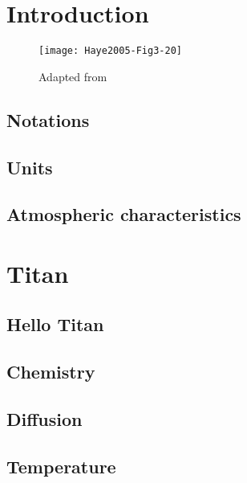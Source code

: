\documentclass{report}
\begin{document}
\title{\PINC}
\author{S.~Plessis \and K.~Mandt}
\date{\theversion}
\maketitle

\tableofcontents

\part{Introduction}
\begin{figure}
\centering
\texttt{[image: Haye2005-Fig3-20]}
\caption{Adapted from \cite{Haye2005}}
\end{figure}
\chapter{Notations}


\chapter{Units}


\chapter{Atmospheric characteristics}


\part{Titan}
\chapter{Hello Titan}


\chapter{Chemistry}


\chapter{Diffusion}


\chapter{Temperature}

\end{document}
